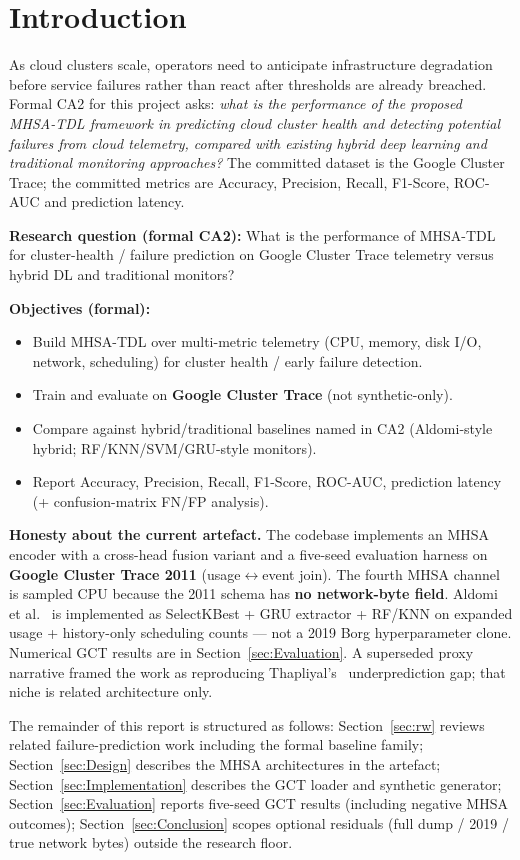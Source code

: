 
\section{Introduction}
\label{sec:Introduction}

As cloud clusters scale, operators need to anticipate infrastructure degradation before service failures rather than react after thresholds are already breached. Formal CA2 for this project asks: \emph{what is the performance of the proposed MHSA-TDL framework in predicting cloud cluster health and detecting potential failures from cloud telemetry, compared with existing hybrid deep learning and traditional monitoring approaches?} The committed dataset is the Google Cluster Trace; the committed metrics are Accuracy, Precision, Recall, F1-Score, ROC-AUC and prediction latency.

\textbf{Research question (formal CA2):} What is the performance of MHSA-TDL for cluster-health / failure prediction on Google Cluster Trace telemetry versus hybrid DL and traditional monitors?

\textbf{Objectives (formal):}
\begin{itemize}
  \item Build MHSA-TDL over multi-metric telemetry (CPU, memory, disk I/O, network, scheduling) for cluster health / early failure detection.
  \item Train and evaluate on \textbf{Google Cluster Trace} (not synthetic-only).
  \item Compare against hybrid/traditional baselines named in CA2 (Aldomi-style hybrid; RF/KNN/SVM/GRU-style monitors).
  \item Report Accuracy, Precision, Recall, F1-Score, ROC-AUC, prediction latency (+ confusion-matrix FN/FP analysis).
\end{itemize}

\textbf{Honesty about the current artefact.} The codebase implements an MHSA encoder with a cross-head fusion variant and a five-seed evaluation harness on \textbf{Google Cluster Trace 2011} (usage$\leftrightarrow$event join). The fourth MHSA channel is sampled CPU because the 2011 schema has \textbf{no network-byte field}. Aldomi et al.~\cite{Aldomi26} is implemented as SelectKBest + GRU extractor + RF/KNN on expanded usage + history-only scheduling counts --- not a 2019 Borg hyperparameter clone. Numerical GCT results are in Section~\ref{sec:Evaluation}. A superseded proxy narrative framed the work as reproducing Thapliyal's~\cite{Thapliyal26} underprediction gap; that niche is related architecture only.

The remainder of this report is structured as follows: Section~\ref{sec:rw} reviews related failure-prediction work including the formal baseline family; Section~\ref{sec:Design} describes the MHSA architectures in the artefact; Section~\ref{sec:Implementation} describes the GCT loader and synthetic generator; Section~\ref{sec:Evaluation} reports five-seed GCT results (including negative MHSA outcomes); Section~\ref{sec:Conclusion} scopes optional residuals (full dump / 2019 / true network bytes) outside the research floor.
